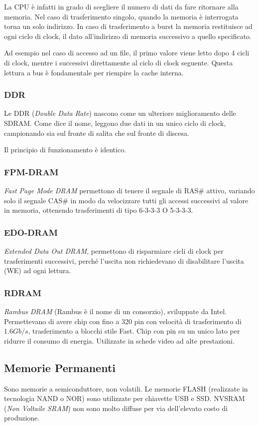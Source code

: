 \documentclass[../template]{subfiles}
\begin{document}
La CPU è infatti in grado di scegliere il numero di dati da fare ritornare alla memoria. Nel caso di trasferimento singolo, quando la memoria è interrogata torna un solo indirizzo. In caso di trasferimento a burst la memoria restituisce ad ogni ciclo di clock, il dato all'indirizzo di memoria successivo a quello specificato.

Ad esempio nel caso di accesso ad un file, il primo valore viene letto dopo 4 cicli di clock, mentre i successivi direttamente al ciclo di clock seguente.
Questa lettura a bus è fondamentale per riempire la cache interna.

\subsubsection{DDR}
Le DDR (\textit{Double Data Rate}) nascono come un ulteriore miglioramento delle SDRAM. Come dice il nome, leggono due dati in un unico ciclo di clock, campionando sia sul fronte di salita che sul fronte di discesa.

Il principio di funzionamento è identico.
\subsubsection{FPM-DRAM}
\textit{Fast Page Mode DRAM} permettono di tenere il segnale di RAS\# attivo, variando solo il segnale CAS\# in modo da velocizzare tutti gli accessi successivi al valore in memoria, ottenendo trasferimenti di tipo 6-3-3-3 O 5-3-3-3.

\subsubsection{EDO-DRAM}
\textit{Extended Data Out DRAM}, permettono di risparmiare cicli di clock per trasferimenti successivi, perché l'uscita non richiedevano di disabilitare l'uscita (WE) ad ogni lettura.

\subsubsection{RDRAM}
\textit{Rambus DRAM} (Rambus è il nome di un consorzio), sviluppate da Intel.
Permettevano di avere chip con fino a 320 pin con velocità di trasferimento di $1.6Gb/s$, trasferimento a blocchi stile Fast.
Chip con pin su un unico lato per ridurre il consumo di energia.
Utilizzate in schede video ad alte prestazioni.

\subsection{Memorie Permanenti}
Sono memorie a semiconduttore, non volatili.
Le memorie FLASH (realizzate in tecnologia NAND o NOR) sono utilizzate per chiavette USB e SSD.
NVSRAM (\textit{Non Voltaile SRAM}) non sono molto diffuse per via dell'elevato costo di produzione.
\end{document}
